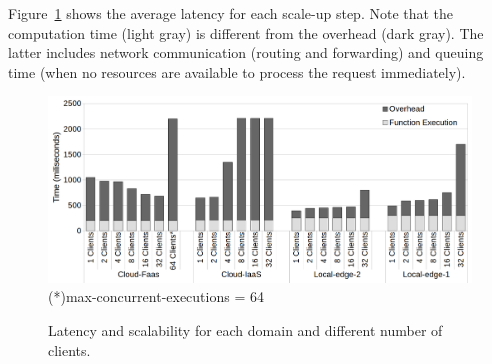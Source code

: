 




Figure~\ref{fig:latency-domains} shows the average latency for each scale-up step. Note that the computation time (light gray) is different from the overhead (dark gray). The latter includes network communication (routing and forwarding) and queuing time (when no resources are available to process the request immediately). 

\begin{figure}
	
	\centering
	\includegraphics[width=.9\textwidth]{figs/latency-domain-new}
	\scriptsize{(*)max-concurrent-executions = 64}
	\vspace{-.3cm}
	\caption{Latency and scalability for each domain and different number of clients.}
	\label{fig:latency-domains}
\end{figure}

